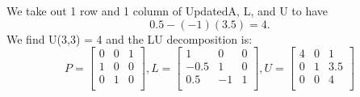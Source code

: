 \documentclass{article}
\DeclareMathOperator{\1}{\mathit{1}}
\numberwithin{figure}{section} %
\begin{document}
We take out 1 row and 1 column of UpdatedA, L, and U to have
    \[
        0.5 - (-1)(3.5) = 4.
    \]
We find U(3,3) = 4 and the LU decomposition is:
    \[
        P =
            \begin{bmatrix}
                0 & 0 & 1 \\
                1 & 0 & 0 \\
                0 & 1 & 0 \\
            \end{bmatrix},
        L =
        \begin{bmatrix}
            1 & 0 & 0 \\
            -0.5 & 1 & 0 \\
            0.5 & -1 & 1 \\
        \end{bmatrix},
        U =
        \begin{bmatrix}
            4 & 0 & 1 \\
            0 & 1 & 3.5 \\
            0 & 0 & 4 \\
        \end{bmatrix}
    \]
\end{document}
